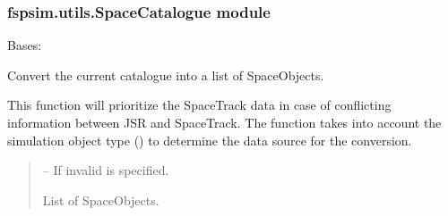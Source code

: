 \documentclass[letterpaper,10pt,english]{sphinxmanual}
\begin{document}
\subsubsection{fspsim.utils.SpaceCatalogue module}
\label{\detokenize{fspsim.utils:module-fspsim.utils.SpaceCatalogue}}\label{\detokenize{fspsim.utils:fspsim-utils-spacecatalogue-module}}

\begin{fulllineitems}
\label{\detokenize{fspsim.utils:fspsim.utils.SpaceCatalogue.SpaceCatalogue}}
\pysigstartsignatures
{}
\pysigstopsignatures
\sphinxAtStartPar
Bases: 

\begin{fulllineitems}
\label{\detokenize{fspsim.utils:fspsim.utils.SpaceCatalogue.SpaceCatalogue.Catalogue2SpaceObjects}}
\pysigstartsignatures
{}
\pysigstopsignatures
\sphinxAtStartPar
Convert the current catalogue into a list of SpaceObjects.

\sphinxAtStartPar
This function will prioritize the SpaceTrack data in case of conflicting information
between JSR and SpaceTrack. The function takes into account the simulation object type
() to determine the data source for the conversion.
\begin{quote}\begin{description}
\sphinxAtStartPar
{} – If invalid  is specified.

\sphinxAtStartPar
List of SpaceObjects.


\end{description}
\end{quote}
\end{fulllineitems}
\end{fulllineitems}
\end{document}
